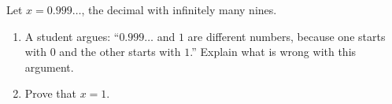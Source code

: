 Let $x=0.999\ldots$, the decimal with infinitely many nines.
\begin{enumerate}
\item[(a)] A student argues: ``$0.999\ldots$ and $1$ are different numbers, because one starts with $0$ and the other starts with $1$.'' Explain what is wrong with this argument.
\item[(b)] Prove that $x=1$.
\end{enumerate}
